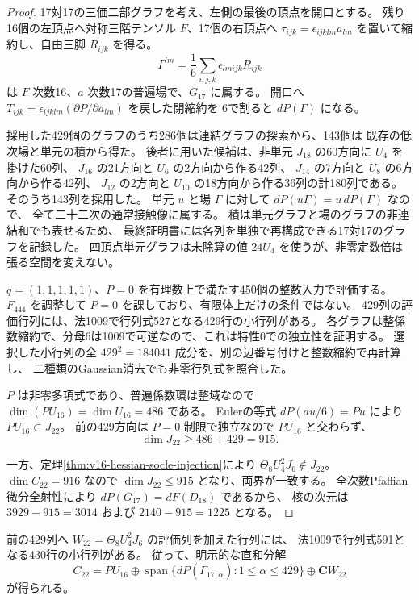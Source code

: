 \begin{proof}
17対17の三価二部グラフを考え、左側の最後の頂点を開口とする。
残り16個の左頂点へ対称三階テンソル $F$、17個の右頂点へ
$\tau_{ijk}=\epsilon_{ijklm}a_{lm}$ を置いて縮約し、自由三脚 $R_{ijk}$ を得る。
\[
 \Gamma^{lm}=\frac16\sum_{i,j,k}\epsilon_{lmijk}R_{ijk}
\]
は $F$ 次数16、$a$ 次数17の普遍場で、$G_{17}$ に属する。
開口へ $T_{ijk}=\epsilon_{ijklm}(\partial P/\partial a_{lm})$ を戻した閉縮約を
6で割ると $dP(\Gamma)$ になる。

採用した429個のグラフのうち286個は連結グラフの探索から、143個は
既存の低次場と単元の積から得た。
後者に用いた候補は、非単元 $J_{18}$ の60方向に $U_4$ を掛けた60列、
$J_{16}$ の21方向と $U_6$ の2方向から作る42列、
$J_{14}$ の7方向と $U_8$ の6方向から作る42列、
$J_{12}$ の2方向と $U_{10}$ の18方向から作る36列の計180列である。
そのうち143列を採用した。
単元 $u$ と場 $\Gamma$ に対して $dP(u\Gamma)=u\,dP(\Gamma)$ なので、
全て二十二次の通常接触像に属する。
積は単元グラフと場のグラフの非連結和でも表せるため、
最終証明書には各列を単独で再構成できる17対17のグラフを記録した。
四頂点単元グラフは未除算の値 $24U_4$ を使うが、非零定数倍は張る空間を変えない。

$q=(1,1,1,1,1)$、$P=0$ を有理数上で満たす450個の整数入力で評価する。
$F_{444}$ を調整して $P=0$ を課しており、有限体上だけの条件ではない。
429列の評価行列には、法1009で行列式527となる429行の小行列がある。
各グラフは整係数縮約で、分母6は1009で可逆なので、これは特性0での独立性を証明する。
選択した小行列の全 $429^2=184041$ 成分を、別の辺番号付けと整数縮約で再計算し、
二種類のGaussian消去でも非零行列式を照合した。

$P$ は非零多項式であり、普遍係数環は整域なので
$\dim(PU_{16})=\dim U_{16}=486$ である。
Eulerの等式 $dP(au/6)=Pu$ により $PU_{16}\subset J_{22}$。
前の429方向は $P=0$ 制限で独立なので $PU_{16}$ と交わらず、
\[
 \dim J_{22}\geq486+429=915.
\]

一方、定理\ref{thm:v16-hessian-socle-injection}により
$\Theta_8U_4^2J_6\notin J_{22}$。
$\dim C_{22}=916$ なので $\dim J_{22}\leq915$ となり、両界が一致する。
全次数Pfaffian微分全射性により $dP(G_{17})=dF(D_{18})$ であるから、
核の次元は $3929-915=3014$ および $2140-915=1225$ となる。
\end{proof}

\begin{proposition}[補元の独立な有限証明書]
\label{prop:v16-twenty-second-complement}
前の429列へ $W_{22}=\Theta_8U_4^2J_6$ の評価列を加えた行列には、
法1009で行列式591となる430行の小行列がある。
従って、明示的な直和分解
\[
 C_{22}=P U_{16}\oplus
 \operatorname{span}\{dP(\Gamma_{17,\alpha}):1\leq\alpha\leq429\}
 \oplus\mathbf C W_{22}
\]
が得られる。
\end{proposition}

